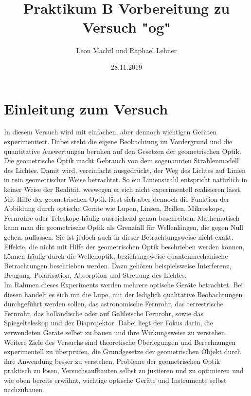 \documentclass[a4paper,10pt]{scrartcl}
\title{Praktikum B Vorbereitung zu Versuch "og"}
\author{Leon Machtl und Raphael Lehner}
\date{28.11.2019}
\begin{document}
	\maketitle
	\tableofcontents
	\newpage
	
	\section{Einleitung zum Versuch}
		In diesem Versuch wird mit einfachen, aber dennoch wichtigen Geräten experimentiert. Dabei steht die eigene Beobachtung im Vordergrund und die quantitative Auswertungen beruhen auf den Gesetzen der geometrischen Optik. Die geometrische Optik macht Gebrauch von dem sogenannten Strahlenmodell des Lichtes. Damit wird, vereinfacht ausgedrückt, der Weg des Lichtes auf Linien in rein geometrischer Weise betrachtet. So ein Linienstrahl entspricht natürlich in keiner Weise der Realität, weswegen er sich nicht experimentell realisieren lässt. Mit Hilfe der geometrischen Optik lässt sich aber dennoch die Funktion der Abbildung durch optische Geräte wie Lupen, Linsen, Brillen, Mikroskope, Fernrohre oder Teleskope häufig ausreichend genau beschreiben. Mathematisch kann man die geometrische Optik als Grenzfall für Wellenlängen, die gegen Null gehen, auffassen. Sie ist jedoch auch in dieser Betrachtungsweise nicht exakt. Effekte, die nicht mit Hilfe der geometrischen Optik beschrieben werden können, können häufig durch die Wellenoptik, beziehungsweise quantenmechanische Betrachtungen beschrieben werden. Dazu gehören beispielsweise Interferenz, Beugung, Polarisation, Absorption und Streuung des Lichtes. \\
		Im Rahmen dieses Experiments werden mehrere optische Geräte betrachtet. Bei diesen handelt es sich um die Lupe, mit der lediglich qualitative Beobachtungen durchgeführt werden sollen, das astronomische Fernrohr, das terrestrische Fernrohr, das holländische oder auf Galileische Fernrohr, sowie das Spiegelteleskop und der Diaprojektor. Dabei liegt der Fokus darin, die verwendeten Geräte selber zu bauen und ihre Wirkungsweise zu verstehen.\\
		Weitere Ziele des Versuchs sind theoretische Überlegungen und Berechnungen experimentell zu überprüfen, die Grundgesetze der geometrischen Objekt durch ihre Anwendung besser zu verstehen, Probleme der geometrischen Optik praktisch zu lösen, Versuchsaufbauten selbst zu justieren und zu optimieren und wie oben bereits erwähnt, wichtige optische Geräte und Instrumente selbst nachzubauen.
		
\end{document}
